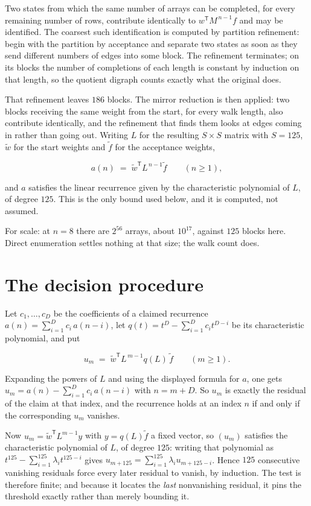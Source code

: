 \documentclass[11pt]{article}
\theoremstyle{definition}
\begin{document}
Two states from which the same number of arrays can be completed, for every remaining number of rows, contribute identically to $w^{\mathsf T}M^{\,n-1}f$ and may be identified. The coarsest such identification is computed by partition refinement: begin with the partition by acceptance and separate two states as soon as they send different numbers of edges into some block. The refinement terminates; on its blocks the number of completions of each length is constant by induction on that length, so the quotient digraph counts exactly what the original does.

That refinement leaves $186$ blocks. The mirror reduction is then applied: two blocks receiving the same weight from the start, for every walk length, also contribute identically, and the refinement that finds them looks at edges coming in rather than going out. Writing $L$ for the resulting $S \times S$ matrix with $S = 125$, $\tilde w$ for the start weights and $\tilde f$ for the acceptance weights,

\[a(n) \;=\; \tilde w^{\mathsf T} L^{\,n-1} \tilde f \qquad (n \ge 1),\]

and $a$ satisfies the linear recurrence given by the characteristic polynomial of $L$, of degree $125$. This is the only bound used below, and it is computed, not assumed.

For scale: at $n = 8$ there are $2^{56}$ arrays, about $10^{17}$, against $125$ blocks here. Direct enumeration settles nothing at that size; the walk count does.

\section{The decision procedure}

Let $c_1,\dots,c_D$ be the coefficients of a claimed recurrence $a(n) = \sum_{i=1}^{D} c_i\,a(n-i)$, let $q(t) = t^{D} - \sum_{i=1}^{D} c_i t^{D-i}$ be its characteristic polynomial, and put

\[u_m \;=\; \tilde w^{\mathsf T} L^{\,m-1} q(L)\,\tilde f \qquad (m \ge 1).\]

Expanding the powers of $L$ and using the displayed formula for $a$, one gets $u_m = a(n) - \sum_{i=1}^{D} c_i\,a(n-i)$ with $n = m + D$. So $u_m$ is exactly the residual of the claim at that index, and the recurrence holds at an index $n$ if and only if the corresponding $u_m$ vanishes.

Now $u_m = \tilde w^{\mathsf T} L^{m-1} y$ with $y = q(L)\tilde f$ a fixed vector, so $(u_m)$ satisfies the characteristic polynomial of $L$, of degree $125$: writing that polynomial as $t^{125} - \sum_{i=1}^{125} \lambda_i t^{125-i}$ gives $u_{m+125} = \sum_{i=1}^{125} \lambda_i u_{m+125-i}$. Hence $125$ consecutive vanishing residuals force every later residual to vanish, by induction. The test is therefore finite; and because it locates the {\itshape last} nonvanishing residual, it pins the threshold exactly rather than merely bounding it.
\end{document}
